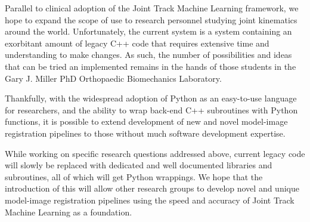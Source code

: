 Parallel to clinical adoption of the Joint Track Machine Learning framework, we hope to expand the scope of use to research personnel studying joint kinematics around the world. Unfortunately, the current system is a system containing an exorbitant amount of legacy C++ code that requires extensive time and understanding to make changes. As such, the number of possibilities and ideas that can be tried an implemented remains in the hands of those students in the Gary J. Miller PhD Orthopaedic Biomechanics Laboratory.

Thankfully, with the widespread adoption of Python as an easy-to-use language for researchers, and the ability to wrap back-end C++ subroutines with Python functions, it is possible to extend development of new and novel model-image registration pipelines to those without much software development expertise.

While working on specific research questions addressed above, current legacy code will slowly be replaced with dedicated and well documented libraries and subroutines, all of which will get Python wrappings. We hope that the introduction of this will allow other research groups to develop novel and unique model-image registration pipelines using the speed and accuracy of Joint Track Machine Learning as a foundation.

